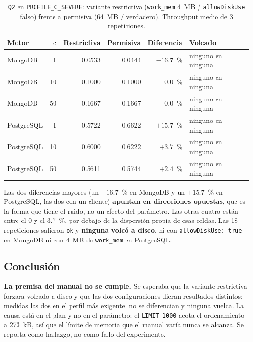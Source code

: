 \begin{table}[htbp]
  \centering
  \caption{\texttt{Q2} en \texttt{PROFILE\_C\_SEVERE}: variante restrictiva
           (\texttt{work\_mem} 4~MB / \texttt{allowDiskUse} falso) frente a
           permisiva (64~MB / verdadero). Throughput medio de 3 repeticiones.}
  \label{tab:variantes}
  \small
  \begin{tabular}{lrrrrl}
    \toprule
    Motor & c & Restrictiva & Permisiva & Diferencia & Volcado \\
    \midrule
    MongoDB    & 1  & 0.0533 & 0.0444 & $-16.7$~\% & ninguno en ninguna \\
    MongoDB    & 10 & 0.1000 & 0.1000 & $0.0$~\%   & ninguno en ninguna \\
    MongoDB    & 50 & 0.1667 & 0.1667 & $0.0$~\%   & ninguno en ninguna \\
    PostgreSQL & 1  & 0.5722 & 0.6622 & $+15.7$~\% & ninguno en ninguna \\
    PostgreSQL & 10 & 0.6000 & 0.6222 & $+3.7$~\%  & ninguno en ninguna \\
    PostgreSQL & 50 & 0.5611 & 0.5744 & $+2.4$~\%  & ninguno en ninguna \\
    \bottomrule
  \end{tabular}
\end{table}

Las dos diferencias mayores (un $-16.7$~\% en MongoDB y un $+15.7$~\% en
PostgreSQL, las dos con un cliente) \textbf{apuntan en direcciones opuestas}, que
es la forma que tiene el ruido, no un efecto del parámetro. Las otras cuatro están
entre el 0 y el 3.7~\%, por debajo de la dispersión propia de esas celdas. Las 18
repeticiones salieron \texttt{ok} y \textbf{ninguna volcó a disco}, ni con
\texttt{allowDiskUse: true} en MongoDB ni con 4~MB de \texttt{work\_mem} en
PostgreSQL.

\subsection{Conclusión}

\textbf{La premisa del manual no se cumple.} Se esperaba que la variante
restrictiva forzara volcado a disco y que las dos configuraciones dieran resultados
distintos; medidas las dos en el perfil más exigente, no se diferencian y ninguna
vuelca. La causa está en el plan y no en el parámetro: el \texttt{LIMIT 1000}
acota el ordenamiento a 273~kB, así que el límite de memoria que el manual varía
nunca se alcanza. Se reporta como hallazgo, no como fallo del experimento.
